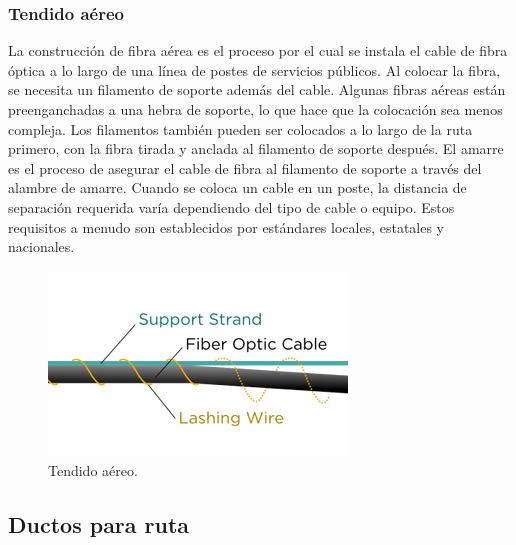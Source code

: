 \documentclass[12pt,letterpaper]{article}
\begin{document}
\subsubsection{Tendido aéreo}
La construcción de fibra aérea es el proceso por el cual se instala el cable de fibra 
óptica a lo largo de una línea de postes de servicios públicos. Al colocar la fibra, se 
necesita un filamento de soporte además del cable. Algunas fibras aéreas están 
preenganchadas a una hebra de soporte, lo que hace que la colocación sea menos compleja. 
Los filamentos también pueden ser colocados a lo largo de la ruta primero, con la fibra 
tirada y anclada al filamento de soporte después. El amarre es el proceso de asegurar el 
cable de fibra al filamento de soporte a través del alambre de amarre. Cuando se coloca 
un cable en un poste, la distancia de separación requerida varía dependiendo del tipo de 
cable o equipo. Estos requisitos a menudo son establecidos por estándares locales, 
estatales y nacionales.
\begin{figure}[ht]
    \centering
    \includegraphics[width=.5\textwidth]{f12.png}
    \caption{Tendido aéreo.}
\end{figure}

\subsection{Ductos para ruta}
\end{document}
